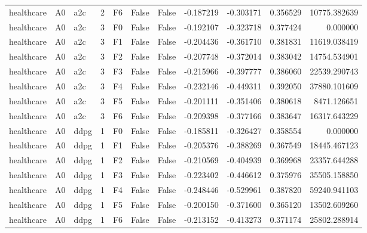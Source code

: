 \begin{tabular}{lllrlllrrrr}
healthcare &      A0 &       a2c &     2 &  F6 &           False &            False & -0.187219 & -0.303171 & 0.356529 &     10775.382639 \\
healthcare &      A0 &       a2c &     3 &  F0 &           False &            False & -0.192107 & -0.323718 & 0.377424 &         0.000000 \\
healthcare &      A0 &       a2c &     3 &  F1 &           False &            False & -0.204436 & -0.361710 & 0.381831 &     11619.038419 \\
healthcare &      A0 &       a2c &     3 &  F2 &           False &            False & -0.207748 & -0.372014 & 0.383042 &     14754.534901 \\
healthcare &      A0 &       a2c &     3 &  F3 &           False &            False & -0.215966 & -0.397777 & 0.386060 &     22539.290743 \\
healthcare &      A0 &       a2c &     3 &  F4 &           False &            False & -0.232146 & -0.449311 & 0.392050 &     37880.101609 \\
healthcare &      A0 &       a2c &     3 &  F5 &           False &            False & -0.201111 & -0.351406 & 0.380618 &      8471.126651 \\
healthcare &      A0 &       a2c &     3 &  F6 &           False &            False & -0.209398 & -0.377166 & 0.383647 &     16317.643229 \\
healthcare &      A0 &      ddpg &     1 &  F0 &           False &            False & -0.185811 & -0.326427 & 0.358554 &         0.000000 \\
healthcare &      A0 &      ddpg &     1 &  F1 &           False &            False & -0.205376 & -0.388269 & 0.367549 &     18445.467123 \\
healthcare &      A0 &      ddpg &     1 &  F2 &           False &            False & -0.210569 & -0.404939 & 0.369968 &     23357.644288 \\
healthcare &      A0 &      ddpg &     1 &  F3 &           False &            False & -0.223402 & -0.446612 & 0.375976 &     35505.158850 \\
healthcare &      A0 &      ddpg &     1 &  F4 &           False &            False & -0.248446 & -0.529961 & 0.387820 &     59240.941103 \\
healthcare &      A0 &      ddpg &     1 &  F5 &           False &            False & -0.200150 & -0.371600 & 0.365120 &     13502.609260 \\
healthcare &      A0 &      ddpg &     1 &  F6 &           False &            False & -0.213152 & -0.413273 & 0.371174 &     25802.288914 \\

\end{tabular}
